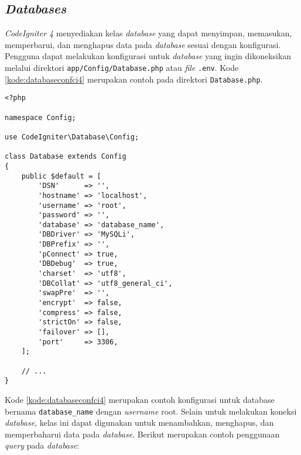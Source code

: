 \subsection{\textit{Databases}}
\textit{CodeIgniter 4} menyediakan kelas \textit{database} yang dapat menyimpan, memasukan, memperbarui, dan menghapus data pada \textit{database} sesuai dengan konfigurasi. Pengguna dapat melakukan konfigurasi untuk \textit{database} yang ingin dikoneksikan melalui direktori \verb|app/Config/Database.php| atau \textit{file} \verb|.env|. Kode \ref{kode:databaseconfci4} merupakan contoh pada direktori \verb|Database.php|.

\begin{lstlisting}[caption=Contoh konfigurasi \textit{database} pada \textit{CodeIgniter 4}. ,label=kode:databaseconfci4]
<?php

namespace Config;

use CodeIgniter\Database\Config;

class Database extends Config
{
    public $default = [
        'DSN'      => '',
        'hostname' => 'localhost',
        'username' => 'root',
        'password' => '',
        'database' => 'database_name',
        'DBDriver' => 'MySQLi',
        'DBPrefix' => '',
        'pConnect' => true,
        'DBDebug'  => true,
        'charset'  => 'utf8',
        'DBCollat' => 'utf8_general_ci',
        'swapPre'  => '',
        'encrypt'  => false,
        'compress' => false,
        'strictOn' => false,
        'failover' => [],
        'port'     => 3306,
    ];

    // ...
}
\end{lstlisting}

Kode \ref{kode:databaseconfci4} merupakan contoh konfigurasi untuk database bernama \verb|database_name| dengan \textit{username} root. Selain untuk melakukan koneksi \textit{database}, kelas ini dapat digunakan untuk menambahkan, menghapus, dan memperbaharui data pada \textit{database}. Berikut merupakan contoh penggunaan \textit{query} pada \textit{database}:

